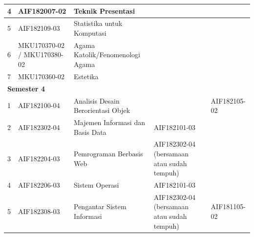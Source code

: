 \documentclass[a4paper,twoside]{article}
\begin{document}
\begin{enumerate}
\begin{enumerate}
\begin{table}[H]
\begin{tabular}{|p{0.5cm}|p{2.85cm}|p{4.95cm}|p{2.7cm}|p{2.7cm}|}
4 & AIF182007-02 & Teknik Presentasi &  &  \\ \hline
5 & AIF182109-03 & Statistika untuk Komputasi &  &  \\ \hline
6 & MKU170370-02 / MKU170380-02 & Agama Katolik/Fenomenologi Agama &  &  \\ \hline
7 & MKU170360-02 & Estetika &  &  \\ \hline
\multicolumn{5}{|l|}{\textbf{Semester 4}} \\ \hline
1 & AIF182100-04 & Analisis Desain Berorientasi Objek &  & AIF182105-02 \\ \hline
2 & AIF182302-04 & Majemen Informasi dan Basis Data & AIF182101-03 &  \\ \hline
3 & AIF182204-03 & Pemrograman Berbasis Web & AIF182302-04 (bersamaan atau sudah tempuh) &  \\ \hline
4 & AIF182206-03 & Sistem Operasi & AIF182101-03 &  \\ \hline
5 & AIF182308-03 & Pengantar Sistem Informasi & AIF182302-04 (bersamaan atau sudah tempuh) & AIF181105-02 \\ \hline
		\end{tabular}
	\label{tab:DaftarMataKuliahWajibDanPrasyaratnya}
\end{table}


\end{enumerate}
\end{enumerate}
\end{document}
